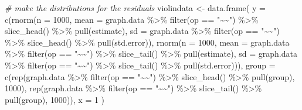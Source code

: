 \documentclass[
  man]{apa7}
\newenvironment{Shaded}{\begin{snugshade}}{\end{snugshade}}
\newcommand{\AttributeTok}[1]{\textcolor[rgb]{0.77,0.63,0.00}{#1}}
\newcommand{\CommentTok}[1]{\textcolor[rgb]{0.56,0.35,0.01}{\textit{#1}}}
\newcommand{\DecValTok}[1]{\textcolor[rgb]{0.00,0.00,0.81}{#1}}
\newcommand{\FunctionTok}[1]{\textcolor[rgb]{0.00,0.00,0.00}{#1}}
\newcommand{\NormalTok}[1]{#1}
\newcommand{\OtherTok}[1]{\textcolor[rgb]{0.56,0.35,0.01}{#1}}
\newcommand{\SpecialCharTok}[1]{\textcolor[rgb]{0.00,0.00,0.00}{#1}}
\newcommand{\StringTok}[1]{\textcolor[rgb]{0.31,0.60,0.02}{#1}}
\begin{document}
\begin{Shaded}
\begin{Highlighting}[]
  \CommentTok{\# make the distributions for the residuals }
\NormalTok{  violindata }\OtherTok{\textless{}{-}} \FunctionTok{data.frame}\NormalTok{(}
  \AttributeTok{y =} \FunctionTok{c}\NormalTok{(}\FunctionTok{rnorm}\NormalTok{(}\AttributeTok{n =} \DecValTok{1000}\NormalTok{, }
            \AttributeTok{mean =}\NormalTok{ graph.data }\SpecialCharTok{\%\textgreater{}\%} \FunctionTok{filter}\NormalTok{(op }\SpecialCharTok{==} \StringTok{"\textasciitilde{}\textasciitilde{}"}\NormalTok{) }\SpecialCharTok{\%\textgreater{}\%} 
              \FunctionTok{slice\_head}\NormalTok{() }\SpecialCharTok{\%\textgreater{}\%} \FunctionTok{pull}\NormalTok{(estimate), }
            \AttributeTok{sd =}\NormalTok{ graph.data }\SpecialCharTok{\%\textgreater{}\%} \FunctionTok{filter}\NormalTok{(op }\SpecialCharTok{==} \StringTok{"\textasciitilde{}\textasciitilde{}"}\NormalTok{) }\SpecialCharTok{\%\textgreater{}\%} 
              \FunctionTok{slice\_head}\NormalTok{() }\SpecialCharTok{\%\textgreater{}\%} \FunctionTok{pull}\NormalTok{(std.error)), }
        \FunctionTok{rnorm}\NormalTok{(}\AttributeTok{n =} \DecValTok{1000}\NormalTok{, }
            \AttributeTok{mean =}\NormalTok{ graph.data }\SpecialCharTok{\%\textgreater{}\%} \FunctionTok{filter}\NormalTok{(op }\SpecialCharTok{==} \StringTok{"\textasciitilde{}\textasciitilde{}"}\NormalTok{) }\SpecialCharTok{\%\textgreater{}\%} 
              \FunctionTok{slice\_tail}\NormalTok{() }\SpecialCharTok{\%\textgreater{}\%} \FunctionTok{pull}\NormalTok{(estimate), }
            \AttributeTok{sd =}\NormalTok{ graph.data }\SpecialCharTok{\%\textgreater{}\%} \FunctionTok{filter}\NormalTok{(op }\SpecialCharTok{==} \StringTok{"\textasciitilde{}\textasciitilde{}"}\NormalTok{) }\SpecialCharTok{\%\textgreater{}\%} 
              \FunctionTok{slice\_tail}\NormalTok{() }\SpecialCharTok{\%\textgreater{}\%} \FunctionTok{pull}\NormalTok{(std.error))),}
  \AttributeTok{group =} \FunctionTok{c}\NormalTok{(}\FunctionTok{rep}\NormalTok{(graph.data }\SpecialCharTok{\%\textgreater{}\%} \FunctionTok{filter}\NormalTok{(op }\SpecialCharTok{==} \StringTok{"\textasciitilde{}\textasciitilde{}"}\NormalTok{) }\SpecialCharTok{\%\textgreater{}\%} 
              \FunctionTok{slice\_head}\NormalTok{() }\SpecialCharTok{\%\textgreater{}\%} \FunctionTok{pull}\NormalTok{(group), }\DecValTok{1000}\NormalTok{),}
            \FunctionTok{rep}\NormalTok{(graph.data }\SpecialCharTok{\%\textgreater{}\%} \FunctionTok{filter}\NormalTok{(op }\SpecialCharTok{==} \StringTok{"\textasciitilde{}\textasciitilde{}"}\NormalTok{) }\SpecialCharTok{\%\textgreater{}\%} 
              \FunctionTok{slice\_tail}\NormalTok{() }\SpecialCharTok{\%\textgreater{}\%} \FunctionTok{pull}\NormalTok{(group), }\DecValTok{1000}\NormalTok{)), }
  \AttributeTok{x =} \DecValTok{1}
\NormalTok{  )}
  

\end{Highlighting}
\end{Shaded}
\end{document}
